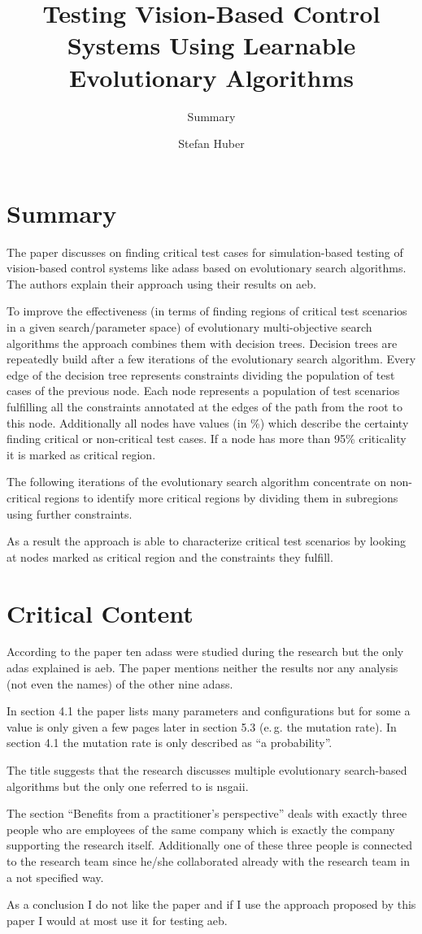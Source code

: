 \documentclass[oneside, notitlepage, twocolumn]{scrartcl}
\title{\LARGE Testing Vision-Based Control Systems Using Learnable Evolutionary Algorithms}
\subtitle{Summary}
\author{Stefan Huber}
\newcommand{\eg}{e.\,g.\xspace}
\begin{document}
\maketitle

\section{Summary}
The paper discusses on finding critical test cases for simulation-based testing of vision-based control systems like \glspl{adas} based on evolutionary search algorithms.
The authors explain their approach using their results on \gls{aeb}.\par
To improve the effectiveness (in terms of finding regions of critical test scenarios in a given search/parameter space) of evolutionary multi-objective search algorithms the approach combines them with decision trees.
Decision trees are repeatedly build after a few iterations of the evolutionary search algorithm.
Every edge of the decision tree represents constraints dividing the population of test cases of the previous node.
Each node represents a population of test scenarios fulfilling all the constraints annotated at the edges of the path from the root to this node.
Additionally all nodes have values (in \%) which describe the certainty finding critical or non-critical test cases.
If a node has more than 95\% criticality it is marked as critical region.\par
The following iterations of the evolutionary search algorithm concentrate on non-critical regions to identify more critical regions by dividing them in subregions using further constraints.\par
As a result the approach is able to characterize critical test scenarios by looking at nodes marked as critical region and the constraints they fulfill.

\section{Critical Content}
According to the paper ten \glspl{adas} were studied during the research but the only \gls{adas} explained is \gls{aeb}.
The paper mentions neither the results nor any analysis (not even the names) of the other nine \glspl{adas}.\par
In section 4.1 the paper lists many parameters and configurations but for some a value is only given a few pages later in section 5.3 (\eg{} the mutation rate).
In section 4.1 the mutation rate is only described as ``a probability''.\par
The title suggests that the research discusses multiple evolutionary search-based algorithms but the only one referred to is \gls{nsgaii}.\par
The section ``Benefits from a practitioner's perspective'' deals with exactly three people who are employees of the same company which is exactly the company supporting the research itself.
Additionally one of these three people is connected to the research team since he/she collaborated already with the research team in a not specified way.\par
As a conclusion I do not like the paper and if I use the approach proposed by this paper I would at most use it for testing \gls{aeb}.
\end{document}
